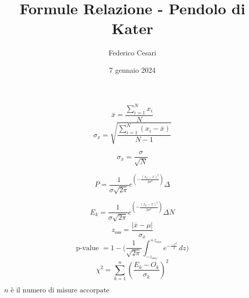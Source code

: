 \documentclass{article}
\title{Formule Relazione - Pendolo di Kater}
\author{Federico Cesari}
\date{7 gennaio 2024}
\begin{document}
\maketitle

\vspace{5cm}

\[
\bar{x} = \frac{\sum_{i=1}^{N}x_{i}}{N}
\]
\[
\sigma_{x} = \sqrt{\frac{\sum_{i=1}^{N}\left(x_{i} - \bar{x}\right)}{N-1}}
\]

\[
\sigma_{\bar{x}} = \frac{\sigma}{\sqrt{N}}
\]

\[
P=\frac{1}{\sigma\sqrt{2\pi}}e^{\left(-\frac{\left(x_{k}-\bar{x}\right)^2}{2\sigma^2}\right)}\Delta
\]

\[
E_{k} = \frac{1}{\sigma\sqrt{2\pi}}e^{\left(-\frac{\left(x_{k}-\bar{x}\right)^2}{2\sigma^2}\right)}\Delta N
\]
\vspace{0.4cm}
\[ 
z_{\text{oss}} = \frac{| \bar{x} - \mu |}{\sigma_{\bar{x}}}
\]
\[ \text{p-value } = 1 - \bigg( \frac{1}{\sqrt{2\pi}} \int_{-z_{oss}}^{+ z_{oss}}e^{-\frac{-z^2}{2}} \,dz \bigg) \]
\[
\chi^2 = \sum_{k=1}^{n}\left(\frac{E_{k}-O_{k}}{\sigma_k}\right)^2
\]
\begin{center}
$n \text{ è il numero di misure accorpate}$
\end{center}
\end{document}

